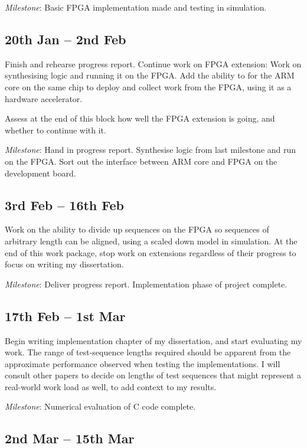 \textit{Milestone}: Basic FPGA implementation made and testing in simulation.

\subsection*{20th Jan -- 2nd Feb}

Finish and rehearse progress report.
\nopagebreak
Continue work on FPGA extension: Work on synthesising logic and running it on the FPGA.
Add the ability to for the ARM core on the same chip to deploy and collect work from the FPGA, using it as a hardware accelerator.

\nopagebreak
Assess at the end of this block how well the FPGA extension is going, and whether to continue with it.

\nopagebreak
\textit{Milestone}: Hand in progress report. Synthesise logic from last milestone and run on the FPGA. Sort out the interface between ARM core and FPGA on the development board.

\subsection*{3rd Feb -- 16th Feb}

Work on the ability to divide up sequences on the FPGA so sequences of arbitrary length can be aligned, using a scaled down model in simulation.
At the end of this work package, stop work on extensions regardless of their progress to focus on writing my dissertation.

\textit{Milestone}: Deliver progress report. Implementation phase of project complete.

\subsection*{17th Feb -- 1st Mar}

Begin writing implementation chapter of my dissertation, and start evaluating my work.
The range of test-sequence lengths required should be apparent from the approximate performance observed when testing the implementations.
I will consult other papers to decide on lengths of test sequences that might represent a real-world work load as well, to add context to my results.

\textit{Milestone}: Numerical evaluation of C code complete.

\subsection*{2nd Mar -- 15th Mar}

